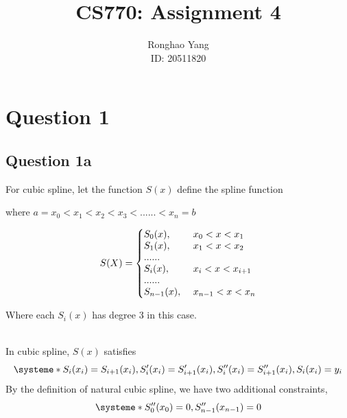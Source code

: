 \documentclass[11pt]{article} %
\title{CS770: Assignment 4}
\author{Ronghao Yang\\ID: 20511820}
\begin{document}
\maketitle

\section{Question 1}
\subsection{Question 1a}
For cubic spline, let the function $S(x)$ define the spline function\\\medskip
\centerline{where $a = x_{0} < x_{1} < x_{2} < x_{3} < ......< x_{n} = b$}
 
\begin{equation}
  S(X)=\left\{
  \begin{array}{@{}ll@{}}
    S_{0}(x), & \text{}\ x_{0}<x<x_{1} \\
    S_{1}(x), & \text{}\ x_{1}<x<x_{2}\\
    ......\\
    S_{i}(x), & \text{} \ x_{i}<x<x_{i+1}\\
    ......\\
    S_{n-1}(x), & \text{}\ x_{n-1}<x<x_{n}
  \end{array}\right.
\end{equation} 
\centerline{Where each $S_{i}(x)$ has degree 3 in this case.}\\
In cubic spline, $S(x)$ satisfies
\[
\systeme*{
S_{i}(x_{i})=S_{i+1}(x_{i}),
S_{i}'(x_{i})=S_{i+1}'(x_{i}), 
S_{i}''(x_{i})=S_{i+1}''(x_{i}),
S_{i}(x_{i}) = y_{i}
}
\]
By the definition of natural cubic spline, we have two additional constraints,
\[
\systeme*{
S_{0}''(x_{0})=0,
S_{n-1}''(x_{n-1})=0
}
\]
\end{document}
